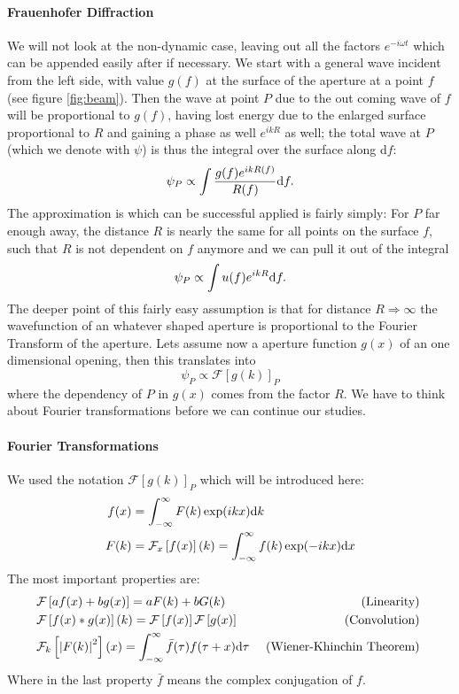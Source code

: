 \paragraph{Frauenhofer Diffraction}
We will not look at the non-dynamic case, leaving out all the factors $e^{-i\omega t}$ which can be appended
easily after if necessary. We start with a general wave incident from the left side, with value $g(f)$ at the
surface of the aperture at a point $f$ (see figure \ref{fig:beam}). Then the wave at point $P$ due to the
out coming wave of $f$ will
be proportional to $g(f)$, having lost
energy due to the enlarged surface proportional to $R$ and gaining a phase as well $e^{ikR}$ as well; 
the total wave at $P$ (which we denote with $\psi$) is thus the integral over the surface along d$f$: 
\begin{equation}
    \label{eq:int1}
    \psi_P \propto \int \frac{g(f) e^{ikR(f)}}{R(f)}\mathrm{d} f.
\end{equation}
The approximation is which can be successful applied is fairly simply: For $P$ far enough away, the distance
$R$ is nearly the same for all points on the surface $f$, such that $R$ is not dependent on $f$ anymore and
we can pull it out of the integral
\begin{equation}
    \label{eq:int1}
    \psi_P \propto \int u(f) e^{ikR}\mathrm{d} f.
\end{equation}
The deeper point of this fairly easy assumption is that for distance $R \Rightarrow \infty$ the wavefunction
of an whatever shaped aperture is proportional to the Fourier Transform of the aperture. Lets assume
now a aperture function $g(x)$ of an one dimensional opening, then this translates into
\begin{equation}
    \psi_P \propto \mathcal{F} \left[g(k)\right ]_P
\end{equation}
where the dependency of $P$ in $g(x)$ comes from the factor $R$.
We have to think about Fourier transformations before we can continue our studies.
\paragraph{Fourier Transformations}
We used the notation  $\mathcal{F} \left[g(k)\right ]_P$ which will be introduced here:
\begin{align}
f(x) &= \int_{-\infty}^{\infty} F(k)\exp(i kx)\mathrm{d} k\\
F(k) &= \mathcal{F}_x\left [f(x)\right ](k) =
\int_{-\infty}^{\infty} f(k)\exp(-i kx) \mathrm{d} x
\end{align}
The most important properties are:
\begin{align}
    \label{eq:fourier}
&\mathcal{F}\left [a f(x) + b g(x)\right ]
    = a F(k) + b G(k) 
    &\mbox{ (Linearity) }\\
&\mathcal{F}\left [f(x) * g(x)\right ](k)
    = \mathcal{F}\left [f(x)\right ]\mathcal{F}\left [g(x)\right ]
    \! &\mbox{ (Convolution) }\\
&\mathcal{F}_k\left [\left | F(k) \right |^2\right ](x)
   =  \int_{-\infty}^{\infty}\bar{f}(\tau)f(\tau + x) \mathrm{d}\tau 
   &\mbox{ (Wiener-Khinchin Theorem) }
\end{align}
Where in the last property $\bar{f}$ means the complex conjugation of $f$.

